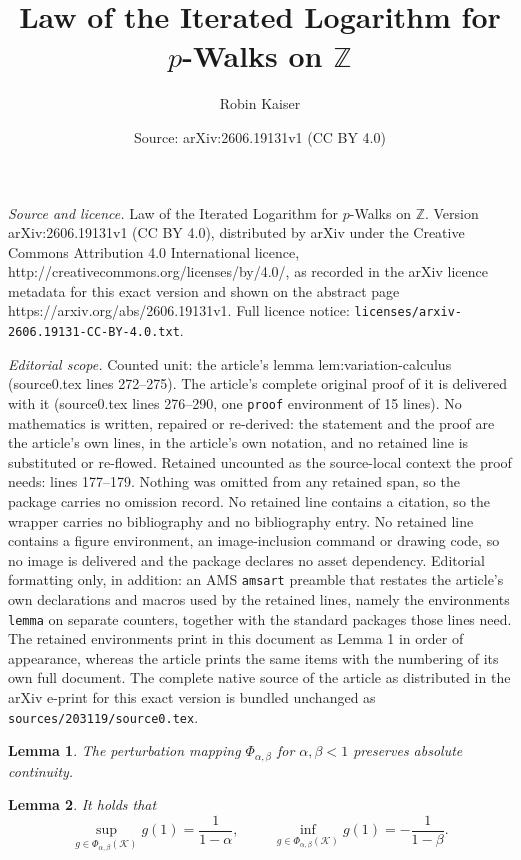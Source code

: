 \documentclass[10pt,a4paper]{amsart}
\title{Law of the Iterated Logarithm for $p$-Walks on $\mathbb{Z}$}
\author{Robin Kaiser}
\date{Source: arXiv:2606.19131v1 (CC BY 4.0)}
\newtheorem{lemma}{Lemma}
\begin{document}
\maketitle

\noindent\emph{Source and licence.} Law of the Iterated Logarithm for $p$-Walks on $\mathbb{Z}$. Version arXiv:2606.19131v1 (CC BY 4.0), distributed by arXiv under the Creative Commons Attribution 4.0 International licence, http://creativecommons.org/licenses/by/4.0/, as recorded in the arXiv licence metadata for this exact version and shown on the abstract page https://arxiv.org/abs/2606.19131v1. Full licence notice: \texttt{licenses/arxiv-2606.19131-CC-BY-4.0.txt}.\par\smallskip

\noindent\textit{Editorial scope.} Counted unit: the article's lemma lem:variation-calculus (source0.tex lines 272--275). The article's complete original proof of it is delivered with it (source0.tex lines 276--290, one \texttt{proof} environment of 15 lines). No mathematics is written, repaired or re-derived: the statement and the proof are the article's own lines, in the article's own notation, and no retained line is substituted or re-flowed.  Retained uncounted as the source-local context the proof needs: lines 177--179.  Nothing was omitted from any retained span, so the package carries no omission record.  No retained line contains a citation, so the wrapper carries no bibliography and no bibliography entry.  No retained line contains a figure environment, an image-inclusion command or drawing code, so no image is delivered and the package declares no asset dependency.  Editorial formatting only, in addition: an AMS \texttt{amsart} preamble that restates the article's own declarations and macros used by the retained lines, namely the environments \texttt{lemma} on separate counters, together with the standard packages those lines need.  The retained environments print in this document as Lemma 1 in order of appearance, whereas the article prints the same items with the numbering of its own full document.  The complete native source of the article as distributed in the arXiv e-print for this exact version is bundled unchanged as \texttt{sources/203119/source0.tex}.
\begin{lemma}\label{lem:absolute-cont-preserved}
    The perturbation mapping $\Phi_{\alpha,\beta}$ for $\alpha,\beta<1$ preserves absolute continuity.
\end{lemma}

\begin{lemma}\label{lem:variation-calculus}
    It holds that
    $$\sup_{g\in\Phi_{\alpha,\beta}(\mathcal{K})}g(1)=\frac{1}{1-\alpha},\hspace{1cm}\inf_{g\in\Phi_{\alpha,\beta}(\mathcal{K})}g(1)=-\frac{1}{1-\beta}.$$
\end{lemma}
\end{document}
